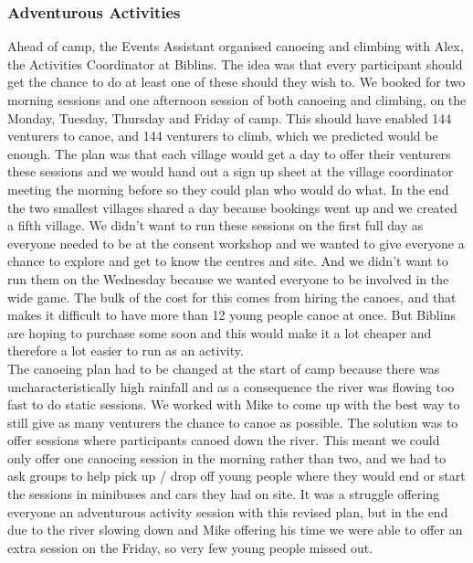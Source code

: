 \subsubsection{Adventurous Activities}
Ahead of camp, the Events Assistant organised canoeing and climbing with Alex, the Activities Coordinator at Biblins. The idea was that every participant should get the chance to do at least one of these should they wish to. We booked for two morning sessions and one afternoon session of both canoeing and climbing, on the Monday, Tuesday, Thursday and Friday of camp. This should have enabled 144 venturers to canoe, and 144 venturers to climb, which we predicted would be enough. The plan was that each village would get a day to offer their venturers these sessions and we would hand out a sign up sheet at the village coordinator meeting the morning before so they could plan who would do what. In the end the two smallest villages shared a day because bookings went up and we created a fifth village. We didn't want to run these sessions on the first full day as everyone needed to be at the consent workshop and we wanted to give everyone a chance to explore and get to know the centres and site. And we didn't want to run them on the Wednesday because we wanted everyone to be involved in the wide game. The bulk of the cost for this comes from hiring the canoes, and that makes it difficult to have more than 12 young people canoe at once. But Biblins are hoping to purchase some soon and this would make it a lot cheaper and therefore a lot easier to run as an activity.\\

The canoeing plan had to be changed at the start of camp because there was uncharacteristically high rainfall and as a consequence the river was flowing too fast to do static sessions. We worked with Mike to come up with the best way to still give as many venturers the chance to canoe as possible. The solution was to offer sessions where participants canoed down the river. This meant we could  only offer one canoeing session in the morning rather than two, and we had to ask groups to help pick up / drop off young people where they would end or start the sessions in minibuses and cars they had on site. It was a struggle offering everyone an adventurous activity session with this revised plan, but in the end due to the river slowing down and Mike offering his time we were able to offer an extra session on the Friday, so very few young people missed out.\\


